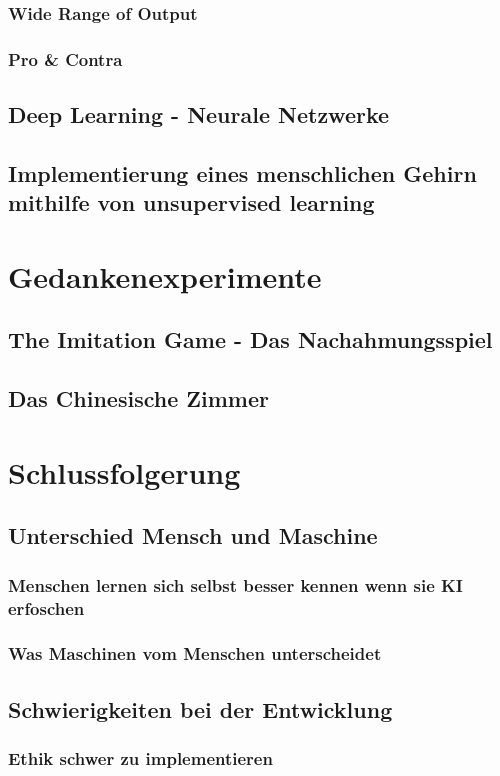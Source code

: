 \documentclass[12pt,german,ngerman]{report}
\begin{document}
        \subsection{Wide Range of Output}
        \subsection{Pro \& Contra}

    \section{Deep Learning - Neurale Netzwerke}
        \section{Implementierung eines menschlichen Gehirn mithilfe von unsupervised learning}

\chapter{Gedankenexperimente}
    \section{The Imitation Game - Das Nachahmungsspiel}
    \section{Das Chinesische Zimmer}

\chapter{Schlussfolgerung}
    \section{Unterschied Mensch und Maschine}
        \subsection{Menschen lernen sich selbst besser kennen wenn sie KI erfoschen}
        \subsection{Was Maschinen vom Menschen unterscheidet}
    \section{Schwierigkeiten bei der Entwicklung}
        \subsection{Ethik schwer zu implementieren}

    \printbibliography[title={Quellenverzeichnis}]
\end{document}
